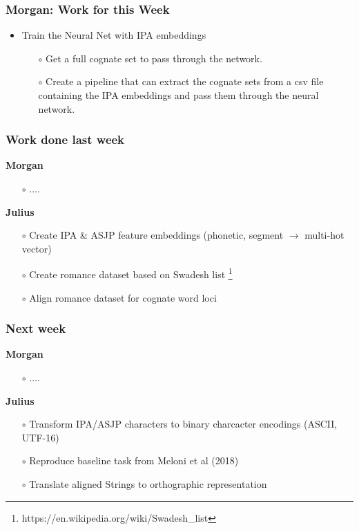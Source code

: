 \documentclass[12pt]{beamer}
\begin{document}
\begin{frame}
    \frametitle{Morgan: Work for this Week}
    \begin{itemize}
        \item Train the Neural Net with IPA embeddings
        \begin{itemize}
            \item[$\circ$] Get a full cognate set to pass through the network.
             \item[$\circ$] Create a pipeline that can extract the cognate sets from a csv file containing the IPA embeddings and pass them through the neural network. 
        \end{itemize}
    \end{itemize}
\end{frame}
\begin{frame}
    \frametitle{Work done last week}
        \textbf{Morgan}
        \begin{itemize}
            \item[$\circ$] ....
        \end{itemize}
        \textbf{Julius}
        \begin{itemize}
            \item[$\circ$] Create IPA \& ASJP feature embeddings (phonetic, segment $\rightarrow$ multi-hot vector) 
            \item[$\circ$] Create romance dataset based on Swadesh list \footnote{https://en.wikipedia.org/wiki/Swadesh\_list}
            \item[$\circ$] Align romance dataset for cognate word loci
        \end{itemize}
\end{frame}

\begin{frame}
    \frametitle{Next week}
        \textbf{Morgan}
        \begin{itemize}
            \item[$\circ$] ....
        \end{itemize}
        \textbf{Julius}
        \begin{itemize}
            \item[$\circ$] Transform IPA/ASJP characters to binary charcacter encodings (ASCII, UTF-16)
            \item[$\circ$] Reproduce baseline task from Meloni et al (2018)
            \item[$\circ$] Translate aligned Strings to orthographic representation 
        \end{itemize}
\end{frame}
\end{document}
